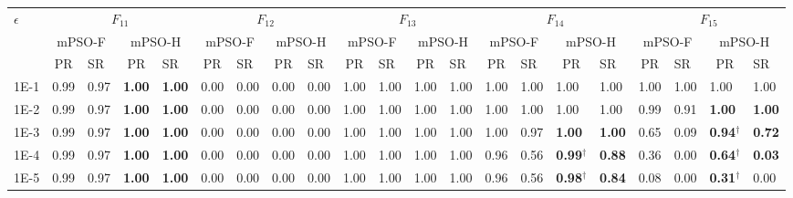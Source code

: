 \begin{table*}[h]
{\begin{tabular}{|p{4.8mm}|p{4.4mm}|p{4.4mm}|p{4.4mm}|p{4.4mm}|p{4.4mm}|p{4.4mm}|p{4.4mm}|p{4.4mm}|p{4.4mm}|p{4.4mm}|p{4.4mm}|p{4.4mm}|p{4.4mm}|p{4.4mm}|p{4.4mm}|p{4.4mm}|p{4.4mm}|p{4.4mm}|p{4.4mm}|p{4.4mm}|}
    \hline
    \multirow{3}{*}{$\epsilon$} & \multicolumn{4}{c|}{$F_{11}$} & \multicolumn{4}{c|}{$F_{12}$} & \multicolumn{4}{c|}{$F_{13}$} & \multicolumn{4}{c|}{$F_{14}$} & \multicolumn{4}{c|}{$F_{15}$} \\

    \cline{2-21}
    & \multicolumn{2}{c|}{mPSO-F} & \multicolumn{2}{c|}{mPSO-H} & \multicolumn{2}{c|}{mPSO-F} & \multicolumn{2}{c|}{mPSO-H} & \multicolumn{2}{c|}{mPSO-F} & \multicolumn{2}{c|}{mPSO-H} & \multicolumn{2}{c|}{mPSO-F} & \multicolumn{2}{c|}{mPSO-H} & \multicolumn{2}{c|}{mPSO-F} & \multicolumn{2}{c|}{mPSO-H} \\

    \cline{2-21}
     & \multicolumn{1}{c|}{PR} & SR & \multicolumn{1}{c|}{PR} & SR & \multicolumn{1}{c|}{PR} & SR & \multicolumn{1}{c|}{PR} & SR & \multicolumn{1}{c|}{PR} & SR & \multicolumn{1}{c|}{PR} & SR & \multicolumn{1}{c|}{PR} & SR & \multicolumn{1}{c|}{PR} & SR & \multicolumn{1}{c|}{PR} & SR & \multicolumn{1}{c|}{PR} & SR \\
    \hline
    1E-1 & 0.99 & 0.97 & \textcolor{customblue}{\textbf{1.00}} & \textcolor{customblue}{\textbf{1.00}} & 0.00 & 0.00 & 0.00 & 0.00 & 1.00 & 1.00 & 1.00 & 1.00 & 1.00 & 1.00 & 1.00 & 1.00 & 1.00 & 1.00 & 1.00 & 1.00 \\
    1E-2 & 0.99 & 0.97 & \textcolor{customblue}{\textbf{1.00}} & \textcolor{customblue}{\textbf{1.00}} & 0.00 & 0.00 & 0.00 & 0.00 & 1.00 & 1.00 & 1.00 & 1.00 & 1.00 & 1.00 & 1.00 & 1.00 & 0.99 & 0.91 & \textcolor{customblue}{\textbf{1.00}} & \textcolor{customblue}{\textbf{1.00}} \\
    1E-3 & 0.99 & 0.97 & \textcolor{customblue}{\textbf{1.00}} & \textcolor{customblue}{\textbf{1.00}} & 0.00 & 0.00 & 0.00 & 0.00 & 1.00 & 1.00 & 1.00 & 1.00 & 1.00 & 0.97 & \textcolor{customblue}{\textbf{1.00}} & \textcolor{customblue}{\textbf{1.00}} & 0.65 & 0.09 & \textcolor{customblue}{\textbf{0.94$^\dagger$}} & \textcolor{customblue}{\textbf{0.72}} \\
    1E-4 & 0.99 & 0.97 & \textcolor{customblue}{\textbf{1.00}} & \textcolor{customblue}{\textbf{1.00}} & 0.00 & 0.00 & 0.00 & 0.00 & 1.00 & 1.00 & 1.00 & 1.00 & 0.96 & 0.56 & \textcolor{customblue}{\textbf{0.99$^\dagger$}} & \textcolor{customblue}{\textbf{0.88}} & 0.36 & 0.00 & \textcolor{customblue}{\textbf{0.64$^\dagger$}} & \textcolor{customblue}{\textbf{0.03}} \\
    1E-5 & 0.99 & 0.97 & \textcolor{customblue}{\textbf{1.00}} & \textcolor{customblue}{\textbf{1.00}} & 0.00 & 0.00 & 0.00 & 0.00 & 1.00 & 1.00 & 1.00 & 1.00 & 0.96 & 0.56 & \textcolor{customblue}{\textbf{0.98$^\dagger$}} & \textcolor{customblue}{\textbf{0.84}} & 0.08 & 0.00 & \textcolor{customblue}{\textbf{0.31$^\dagger$}} & 0.00 \\

\end{tabular}}
\end{table*}
